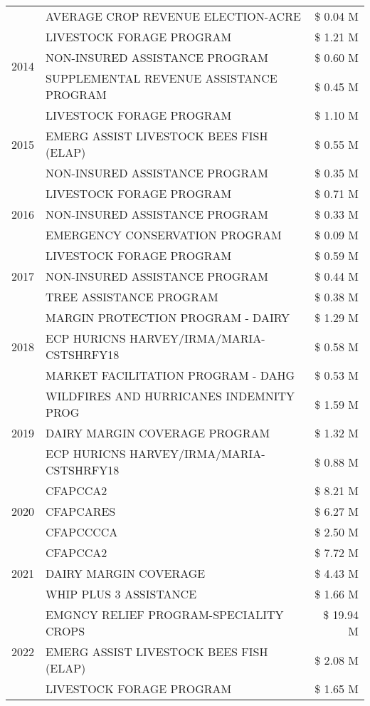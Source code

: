 \begin{tabular}{llr}
 & AVERAGE CROP REVENUE ELECTION-ACRE & \$ 0.04 M \\
\cline{1-3}
\multirow[t]{3}{*}{2014} & LIVESTOCK FORAGE PROGRAM & \$ 1.21 M \\
 & NON-INSURED ASSISTANCE PROGRAM & \$ 0.60 M \\
 & SUPPLEMENTAL REVENUE ASSISTANCE PROGRAM & \$ 0.45 M \\
\cline{1-3}
\multirow[t]{3}{*}{2015} & LIVESTOCK FORAGE PROGRAM & \$ 1.10 M \\
 & EMERG ASSIST LIVESTOCK BEES FISH (ELAP) & \$ 0.55 M \\
 & NON-INSURED ASSISTANCE PROGRAM & \$ 0.35 M \\
\cline{1-3}
\multirow[t]{3}{*}{2016} & LIVESTOCK FORAGE PROGRAM & \$ 0.71 M \\
 & NON-INSURED ASSISTANCE PROGRAM & \$ 0.33 M \\
 & EMERGENCY CONSERVATION PROGRAM & \$ 0.09 M \\
\cline{1-3}
\multirow[t]{3}{*}{2017} & LIVESTOCK FORAGE PROGRAM & \$ 0.59 M \\
 & NON-INSURED ASSISTANCE PROGRAM & \$ 0.44 M \\
 & TREE ASSISTANCE PROGRAM & \$ 0.38 M \\
\cline{1-3}
\multirow[t]{3}{*}{2018} & MARGIN PROTECTION PROGRAM - DAIRY & \$ 1.29 M \\
 & ECP HURICNS HARVEY/IRMA/MARIA-CSTSHRFY18 & \$ 0.58 M \\
 & MARKET FACILITATION PROGRAM - DAHG & \$ 0.53 M \\
\cline{1-3}
\multirow[t]{3}{*}{2019} & WILDFIRES AND HURRICANES INDEMNITY PROG & \$ 1.59 M \\
 & DAIRY MARGIN COVERAGE PROGRAM & \$ 1.32 M \\
 & ECP HURICNS HARVEY/IRMA/MARIA-CSTSHRFY18 & \$ 0.88 M \\
\cline{1-3}
\multirow[t]{3}{*}{2020} & CFAPCCA2 & \$ 8.21 M \\
 & CFAPCARES & \$ 6.27 M \\
 & CFAPCCCCA & \$ 2.50 M \\
\cline{1-3}
\multirow[t]{3}{*}{2021} & CFAPCCA2 & \$ 7.72 M \\
 & DAIRY MARGIN COVERAGE & \$ 4.43 M \\
 & WHIP PLUS 3 ASSISTANCE & \$ 1.66 M \\
\cline{1-3}
\multirow[t]{3}{*}{2022} & EMGNCY RELIEF PROGRAM-SPECIALITY CROPS & \$ 19.94 M \\
 & EMERG ASSIST LIVESTOCK BEES FISH (ELAP) & \$ 2.08 M \\
 & LIVESTOCK FORAGE PROGRAM & \$ 1.65 M \\
\cline{1-3}
\bottomrule
\end{tabular}
